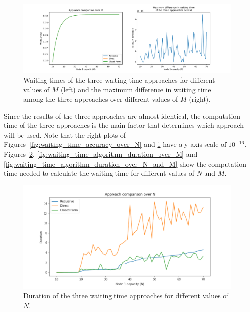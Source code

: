 \begin{figure}[H]
    \includegraphics[width=\textwidth]{chapters/03_queueing_model/img/numeric_results_and_timings/waiting_time_formulas_comparison/waiting_time_over_M.pdf}
    \caption{Waiting times of the three waiting time approaches for different
    values of \(M\) (left) and the maximum difference in waiting time among
    the three approaches over different values of \(M\) (right).}
    \label{fig:waiting_time_accuracy_over_M}
\end{figure}


Since the results of the three approaches are almost identical, the computation
time of the three approaches is the main factor that determines which
approach will be used.
Note that the right plots of Figures~\ref{fig:waiting_time_accuracy_over_N} and
\ref{fig:waiting_time_accuracy_over_M} have a y-axis scale of \(10^{-16}\).
Figures~\ref{fig:waiting_time_algorithm_duration_over_N}, 
\ref{fig:waiting_time_algorithm_duration_over_M} and 
\ref{fig:waiting_time_algorithm_duration_over_N_and_M} show the computation
time needed to calculate the waiting time for different values of \(N\) and
\(M\).

\begin{figure}[H]
    \includegraphics[width=\textwidth]{chapters/03_queueing_model/img/numeric_results_and_timings/waiting_time_formulas_comparison/algorithm_duration_over_N.pdf}
    \caption{Duration of the three waiting time approaches for different values
    of \(N\).}
    \label{fig:waiting_time_algorithm_duration_over_N}
\end{figure}


